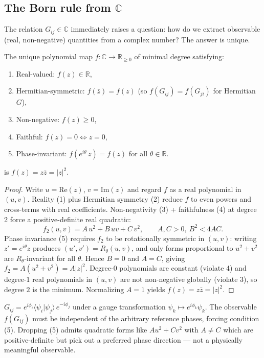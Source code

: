\subsection{The Born rule from $\mathbb{C}$}

The relation $G_{ij} \in \mathbb{C}$ immediately raises a question: how do we extract observable (real, non-negative) quantities from a complex number? The answer is unique.

\begin{theorem}
The unique polynomial map $f: \mathbb{C} \to \mathbb{R}_{\geq 0}$ of minimal degree satisfying:
\begin{enumerate}
\item Real-valued: $f(z) \in \mathbb{R}$,
\item Hermitian-symmetric: $f(\bar z) = f(z)$ (so $f(G_{ij}) = f(G_{ji})$ for Hermitian $G$),
\item Non-negative: $f(z) \geq 0$,
\item Faithful: $f(z) = 0 \Leftrightarrow z = 0$,
\item Phase-invariant: $f(e^{i\theta}\,z) = f(z)$ for all $\theta \in \mathbb{R}$.
\end{enumerate}
is $f(z) = z\bar{z} = |z|^2$.
\end{theorem}

\begin{proof}
Write $u = \mathrm{Re}(z)$, $v = \mathrm{Im}(z)$ and regard $f$ as a real polynomial in $(u,v)$.  Reality (1) plus Hermitian symmetry (2) reduce $f$ to even powers and cross-terms with real coefficients.  Non-negativity (3) + faithfulness (4) at degree 2 force a positive-definite real quadratic:
\[
  f_2(u,v) = A\,u^2 + B\,uv + C\,v^2, \qquad A, C > 0,\ B^2 < 4AC.
\]
Phase invariance (5) requires $f_2$ to be rotationally symmetric in $(u,v)$: writing $z' = e^{i\theta}z$ produces $(u',v') = R_\theta(u,v)$, and only forms proportional to $u^2 + v^2$ are $R_\theta$-invariant for all $\theta$. Hence $B = 0$ and $A = C$, giving $f_2 = A(u^2+v^2) = A |z|^2$.  Degree-$0$ polynomials are constant (violate 4) and degree-$1$ real polynomials in $(u,v)$ are not non-negative globally (violate 3), so degree $2$ is the minimum.  Normalizing $A = 1$ yields $f(z) = z\bar z = |z|^2$.
\end{proof}

\begin{remark}
$G_{ij} = e^{i\phi_i}\langle\psi_i|\psi_j\rangle\,e^{-i\phi_j}$ under a gauge transformation $\psi_k \mapsto e^{i\phi_k}\psi_k$.  The observable $f(G_{ij})$ must be independent of the arbitrary reference phases, forcing condition (5).  Dropping (5) admits quadratic forms like $A u^2 + C v^2$ with $A \neq C$ which are positive-definite but pick out a preferred phase direction --- not a physically meaningful observable.
\end{remark}

